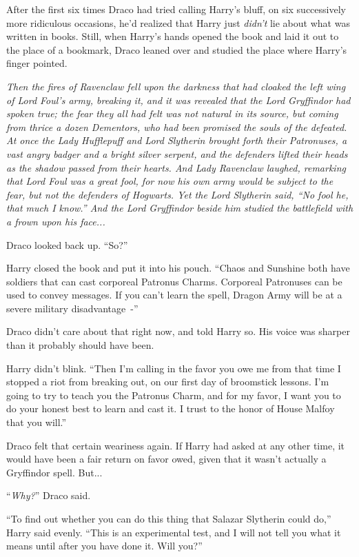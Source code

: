 After the first six times Draco had tried calling Harry's bluff, on six successively more ridiculous occasions, he'd realized that Harry just \emph{didn't} lie about what was written in books. Still, when Harry's hands opened the book and laid it out to the place of a bookmark, Draco leaned over and studied the place where Harry's finger pointed.

\emph{Then the fires of Ravenclaw fell upon the darkness that had cloaked the left wing of Lord Foul's army, breaking it, and it was revealed that the Lord Gryffindor had spoken true; the fear they all had felt was not natural in its source, but coming from thrice a dozen Dementors, who had been promised the souls of the defeated. At once the Lady Hufflepuff and Lord Slytherin brought forth their Patronuses, a vast angry badger and a bright silver serpent, and the defenders lifted their heads as the shadow passed from their hearts. And Lady Ravenclaw laughed, remarking that Lord Foul was a great fool, for now his own army would be subject to the fear, but not the defenders of Hogwarts. Yet the Lord Slytherin said, ``No fool he, that much I know.'' And the Lord Gryffindor beside him studied the battlefield with a frown upon his face...}

Draco looked back up. ``So?''

Harry closed the book and put it into his pouch. ``Chaos and Sunshine both have soldiers that can cast corporeal Patronus Charms. Corporeal Patronuses can be used to convey messages. If you can't learn the spell, Dragon Army will be at a severe military disadvantage~-''

Draco didn't care about that right now, and told Harry so. His voice was sharper than it probably should have been.

Harry didn't blink. ``Then I'm calling in the favor you owe me from that time I stopped a riot from breaking out, on our first day of broomstick lessons. I'm going to try to teach you the Patronus Charm, and for my favor, I want you to do your honest best to learn and cast it. I trust to the honor of House Malfoy that you will.''

Draco felt that certain weariness again. If Harry had asked at any other time, it would have been a fair return on favor owed, given that it wasn't actually a Gryffindor spell. But...

``\emph{Why?}'' Draco said.

``To find out whether you can do this thing that Salazar Slytherin could do,'' Harry said evenly. ``This is an experimental test, and I will not tell you what it means until after you have done it. Will you?''

